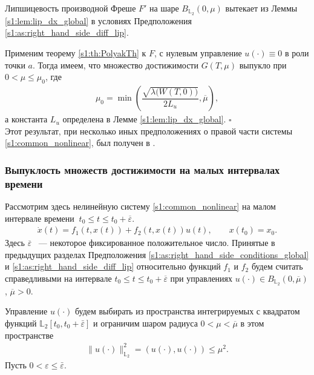 \documentclass[../main.tex]{subfiles}
\begin{document}
Липшицевость производной Фреше $F'$ на шаре $B_{\mathbb{L}_2}(0,\mu)$ вытекает из Леммы \ref{s1:lem:lip_dx_global} в условиях Предположения \ref{s1:as:right_hand_side_diff_lip}. 
    
Применим теорему \ref{s1:th:PolyakTh} к $F$, с нулевым управление $u(\cdot) \equiv 0$ в роли точки $a$. 
Тогда имеем, что множество достижимости $G(T,\mu)$ выпукло при $ 0 < \mu \leqslant \mu_0 $, где  
\begin{gather}\label{s1:mu0}
    \mu_0 = \min\left( \dfrac{\sqrt{\lambda\big(W(T,0)\big)}}{2L_u}, \overline{\mu} \right), 
\end{gather}
а константа $L_u $ определена в Лемме  \ref{s1:lem:lip_dx_global}. 
\hfill$\square$\\[1ex]%
Этот результат, при несколько иных предположениях о правой части системы \eqref{s1:common_nonlinear}, был получен в \cite{Polyak2004}.
    
\subsubsection{Выпуклость множеств достижимости на малых интервалах времени}
\label{s1:small_time_subsection}
Рассмотрим здесь нелинейную систему \eqref{s1:common_nonlinear} на малом интервале времени $\ t_0 \leqslant t \leqslant t_0 + \overline{\varepsilon} $.
\begin{gather}\label{s1:common_nonlinear_small_time}
    \dot{x}(t)=f_1(t,x(t))+f_2(t,x(t))u(t), \qquad x(t_0) = x_0.
\end{gather}
Здесь $ \overline{\varepsilon} $ ~--- некоторое фиксированное положительное число.
Принятые в предыдущих разделах Предположения \ref{s1:as:right_hand_side_conditions_global} и \ref{s1:as:right_hand_side_diff_lip} относительно функций $f_1$ и $f_2$ будем считать справедливыми на интервале $t_0 \leqslant t \leqslant t_0 + \overline{\varepsilon} $ при управлениях $u(\cdot) \in B_{\mathbb{L}_2}(0, \overline{\mu}) $, $\overline{\mu} > 0$.
   

Управление $u(\cdot)$ будем выбирать из пространства интегрируемых с квадратом функций $\mathbb{L}_2[t_0,t_0+\bar{\varepsilon}]$ и ограничим шаром радиуса $  0 < \mu < \overline{\mu} $ в этом пространстве
\begin{gather*}
    \lVert u(\cdot)\rVert^2_{\mathbb{L}_2} = \left(u(\cdot),u(\cdot) \right) \leqslant \mu^2.
\end{gather*}
Пусть $ 0 <  \varepsilon \leqslant \bar{\varepsilon} $.
 
\end{document}
